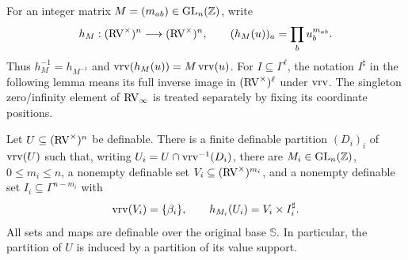 For an integer matrix $M=(m_{ab})\in\operatorname{GL}_n(\mathbb Z)$, write
\[
 h_M:(\mathrm{RV}^\times)^n\longrightarrow(\mathrm{RV}^\times)^n,\qquad
 (h_M(u))_a=\prod_b u_b^{m_{ab}}.
\]
Thus $h_M^{-1}=h_{M^{-1}}$ and
$\operatorname{vrv}(h_M(u))=M\operatorname{vrv}(u)$. For $I\subseteq\Gamma^\ell$, the notation
$I^\sharp$ in the following lemma means its full inverse image in
$(\mathrm{RV}^\times)^\ell$ under $\operatorname{vrv}$. The singleton zero/infinity element
of $\mathrm{RV}_\infty$ is treated separately by fixing its coordinate positions.


\begin{lem}\label{coh:decom}
Let $U\subseteq(\mathrm{RV}^\times)^n$ be definable. There is a finite definable
partition $(D_i)_i$ of $\operatorname{vrv}(U)$ such that, writing
$U_i=U\cap\operatorname{vrv}^{-1}(D_i)$, there are $M_i\in\operatorname{GL}_n(\mathbb Z)$,
$0\leq m_i\leq n$, a nonempty definable set
$V_i\subseteq(\mathrm{RV}^\times)^{m_i}$, and a nonempty definable set
$I_i\subseteq\Gamma^{n-m_i}$ with
\[
 \operatorname{vrv}(V_i)=\{\beta_i\},\qquad
 h_{M_i}(U_i)=V_i\times I_i^\sharp .
\]
All sets and maps are definable over the original base $\mathbb S$.
In particular, the partition of $U$ is induced by a partition of
its value support.
\end{lem}

